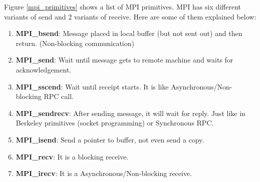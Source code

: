 \documentclass[twoside]{article}
\begin{document}
Figure \ref{mpi_primitives} shows a list of MPI primitives. MPI has six different variants of send and 2 variants of receive.  Here are some of them explained below:
\begin{enumerate}
\item \textbf{MPI\_bsend}: Message placed in local buffer (but not sent out) and then return. (Non-blocking communication)
\item \textbf{MPI\_send}: Wait until message gets to remote machine and waits for acknowledgement.
\item \textbf{MPI\_sscend}: Wait until receipt starts. It is like Asynchronous/Non-blocking RPC call.
\item \textbf{MPI\_sendrecv}: After sending message, it will wait for reply. Just like in Berkeley primitives (socket programming) or Synchronous RPC.
\item \textbf{MPI\_isend}: Send a pointer to buffer, not even send a copy.
\item \textbf{MPI\_recv}: It is a blocking receive.
\item \textbf{MPI\_irecv}: It is a Asynchronous/Non-blocking receive.
\end{enumerate}

\end{document}
